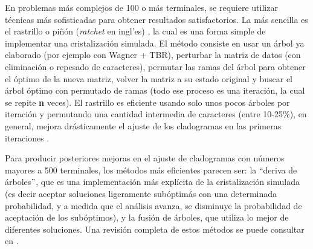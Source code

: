 \begin{itemize}
\begin{enumerate}
En problemas m\'as complejos de 100 o m\'as terminales, se requiere utilizar t\'ecnicas m\'as sofisticadas para obtener resultados satisfactorios. La m\'as sencilla es el rastrillo o pi\~n\'on (\textit{ratchet} en ingl'es)
\citep{Nixon1999,Quicke2001}, 
la cual es una forma simple de implementar una cristalizaci\'on simulada. El m\'etodo consiste en usar un \'arbol ya elaborado (por ejemplo con Wagner + TBR),  perturbar la matriz de datos (con eliminaci\'on o repesado de caracteres), permutar las ramas del \'arbol para obtener el \'optimo de la nueva matriz,  volver la matriz a su estado original y buscar el \'arbol \'optimo con permutado de ramas (todo ese proceso es una iteraci\'on,  la cual se repite \textbf{n} veces). El rastrillo es eficiente usando solo unos pocos \'arboles por iteraci\'on y permutando una cantidad intermedia de caracteres (entre 10-25\%), en general, mejora dr\'asticamente el ajuste de los cladogramas en las primeras iteraciones 
\citep{Nixon1999}.
 
Para producir posteriores mejoras en el ajuste de cladogramas con n\'umeros mayores a 500 terminales,  los m\'etodos m\'as eficientes parecen ser: la ``deriva de \'arboles$"$,  que es una implementaci\'on m\'as expl\'icita de la cristalizaci\'on simulada (es decir aceptar soluciones ligeramente sub\'optim\'as con una determinada probabilidad,  y a medida que el an\'alisis avanza,  se disminuye la probabilidad de aceptaci\'on de los sub\'optimos), y la fusi\'on de \'arboles,  que utiliza lo mejor de diferentes soluciones. Una revisi\'on completa de estos m\'etodos se puede consultar en 
\cite{Goloboff1999}.
  


\end{enumerate}


\end{itemize}
